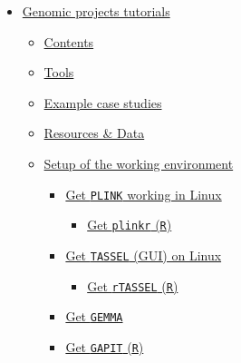 \documentclass[a4paper,10pt]{article}
\begin{document}
\begin{itemize}
  \tightlist
  \item
        \protect\hyperlink{genomic-projects-tutorials}{Genomic projects
          tutorials}

        \begin{itemize}
          \tightlist
          \item
                \protect\hyperlink{contents}{Contents}
          \item
                \protect\hyperlink{tools}{Tools}
          \item
                \protect\hyperlink{example-case-studies}{Example case studies}
          \item
                \protect\hyperlink{resources--data}{Resources \& Data}
          \item
                \protect\hyperlink{setup-of-the-working-environment}{Setup of the
                  working environment}

                \begin{itemize}
                  \tightlist
                  \item
                        \protect\hyperlink{get-plink-working-in-linux}{Get \texttt{PLINK}
                          working in Linux}

                        \begin{itemize}
                          \tightlist
                          \item
                                \protect\hyperlink{get-plinkr-r}{Get \texttt{plinkr}
                                  (\texttt{R})}
                        \end{itemize}
                  \item
                        \protect\hyperlink{get-tassel-gui-on-linux}{Get \texttt{TASSEL}
                          (GUI) on Linux}

                        \begin{itemize}
                          \tightlist
                          \item
                                \protect\hyperlink{get-rtassel-r}{Get \texttt{rTASSEL}
                                  (\texttt{R})}
                        \end{itemize}
                  \item
                        \protect\hyperlink{get-gemma}{Get \texttt{GEMMA}}
                  \item
                        \protect\hyperlink{get-gapit-r}{Get \texttt{GAPIT} (\texttt{R})}
                \end{itemize}
        \end{itemize}
\end{itemize}
\end{document}
